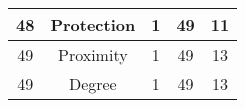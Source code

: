 \documentclass[results.tex]{subfiles}
\begin{document}
\begin{center}
\begin{tabular}{| c || c | c | c | c |}
            \hline
            48                      & Protection                   & 1                      & 49                      & 11                   \\
            \hline
            49                      & Proximity                    & 1                      & 49                      & 13                   \\
            \hline
            49                      & Degree                       & 1                      & 49                      & 13                   \\
            \hline
        \end{tabular}
    \end{center}
\end{document}
